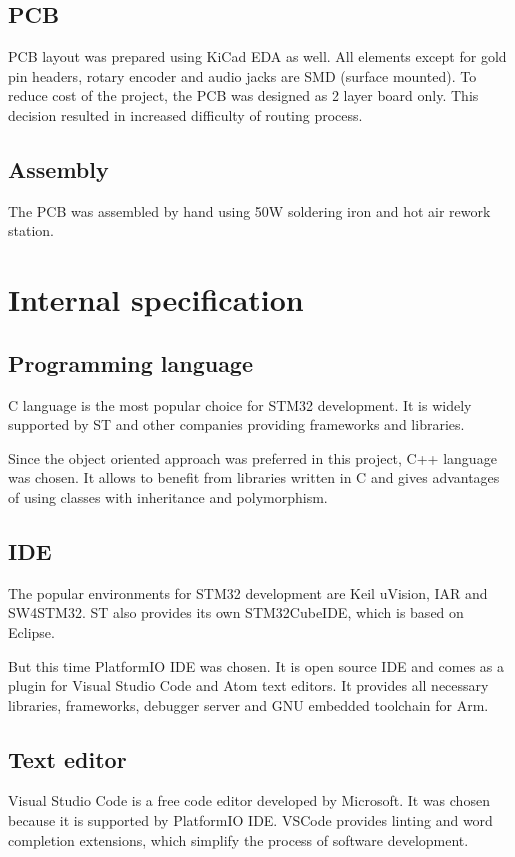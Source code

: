 \documentclass{article}
\begin{document}
\subsection{PCB}
PCB layout was prepared using KiCad EDA as well.
All elements except for gold pin headers, rotary encoder and audio jacks are SMD (surface mounted).
To reduce cost of the project, the PCB was designed as 2 layer board only.
This decision resulted in increased difficulty of routing process.

\subsection{Assembly}
The PCB was assembled by hand using 50W soldering iron and hot air rework station.
\newpage



\section{Internal specification}

\subsection{Programming language}
C language is the most popular choice for STM32 development.
It is widely supported by ST and other companies providing frameworks and libraries. 

Since the object oriented approach was preferred in this project, C++ language was chosen.
It allows to benefit from libraries written in C and gives advantages of using classes with inheritance and polymorphism.

\subsection{IDE}
The popular environments for STM32 development are Keil uVision, IAR and SW4STM32.
ST also provides its own STM32CubeIDE, which is based on Eclipse.

But this time PlatformIO IDE was chosen.
It is open source IDE and comes as a plugin for Visual Studio Code and Atom text editors.
It provides all necessary libraries, frameworks, debugger server and GNU embedded toolchain for Arm.

\subsection{Text editor}
Visual Studio Code is a free code editor developed by Microsoft.
It was chosen because it is supported by PlatformIO IDE.
VSCode provides linting and word completion extensions,
which simplify the process of software development.
\end{document}
